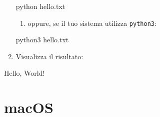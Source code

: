 \documentclass[
  letterpaper,
]{scrbook}
\newenvironment{Shaded}{\begin{snugshade}}{\end{snugshade}}
\newcommand{\NormalTok}[1]{\textcolor[rgb]{0.00,0.23,0.31}{#1}}
\providecommand{\tightlist}{%
  \setlength{\itemsep}{0pt}\setlength{\parskip}{0pt}}\usepackage{longtable,booktabs,array}
\begin{document}
\begin{enumerate}
\begin{Shaded}
\begin{Highlighting}[]
\NormalTok{python hello.txt}
\end{Highlighting}
\end{Shaded}

  \begin{enumerate}
  \def\labelenumii{\roman{enumii}.}
  \setcounter{enumii}{3}
  \tightlist
  \item
    oppure, se il tuo sistema utilizza \texttt{python3}:
  \end{enumerate}

\begin{Shaded}
\begin{Highlighting}[]
\NormalTok{python3 hello.txt}
\end{Highlighting}
\end{Shaded}
\item
  Visualizza il risultato:
\end{enumerate}

\begin{Shaded}
\begin{Highlighting}[]
\NormalTok{Hello, World!}
\end{Highlighting}
\end{Shaded}

\section{macOS}
\end{document}

